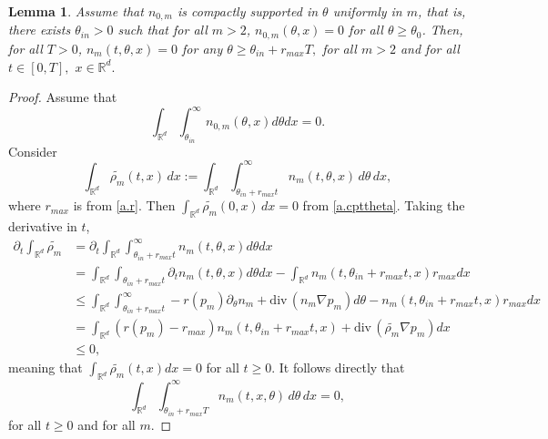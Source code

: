 \documentclass{amsart}
\newtheorem{lemma}[theorem]{Lemma}
\def\R{\mathbb R}
\def\div{\mathrm{div}\,}
\begin{document}
\begin{lemma}\label{t.cptspt}
    Assume that $n_{0,m}$ is compactly supported in $\theta$ uniformly in $m$, that is, there exists $\theta_{in}>0$ such that for all $m>2$, $n_{0,m}(\theta,x)=0$ for all $\theta \geq \theta_0$. Then, for all $T>0$, $n_m(t,\theta,x)=0$ for any $\theta \geq \theta_{in}+r_{max}T,$ for all $m>2$ and for all $t \in [0,T],$ $x \in \R^d.$
\end{lemma}
\begin{proof}
    Assume that
    \begin{equation}\label{a.cpttheta}
    \int_{\R^d}\int_{\theta_{in}}^{\infty}n_{0,m}(\theta,x)d\theta dx=0.
    \end{equation}
    Consider 
    $$
   \int_{\R^d} \widetilde{\rho_m}(t,x)\,dx:=\int_{\R^d}\int_{\theta_{in}+r_{max}t}^{\infty}n_m(t,\theta,x)\,d\theta \, dx,
    $$
    where $r_{max}$ is from \eqref{a.r}.  Then $\int_{\R^d}\tilde{\rho_m}(0,x)\,dx=0$ from \eqref{a.cpttheta}. 
    Taking the derivative in $t$,
    \begin{align*}
       \partial_t \int_{\R^d}\widetilde{\rho_m}&= \partial_t \int_{\R^d}\int_{\theta_{in}+r_{max}t}^{\infty}n_m(t,\theta,x)d\theta dx \\&=\int_{\R^d}\int_{\theta_{in}+r_{max}t} \partial_t n_m(t,\theta,x)d\theta dx -\int_{\R^d}n_m(t,\theta_{in}+r_{max}t,x)r_{max}dx\\
       &\leq \int_{\R^d}\int_{\theta_{in}+r_{max}t}^{\infty}-r(p_m)\partial_\theta n_m +\div(n_m \nabla p_m)d\theta -n_m(t,\theta_{in}+r_{max}t,x)r_{max}dx \\
       &=\int_{\R^d}(r(p_m)-r_{max})n_m(t,\theta_{in}+r_{max}t,x)+\div(\tilde{\rho_m}\nabla p_m) dx \\
       & \leq 0,
    \end{align*}
    meaning that $\int_{\R^d}\widetilde{\rho_m}(t,x)dx=0$ for all $t\geq 0$. It follows directly that 
    $$
    \int_{\R^d}\int_{\theta_{in}+r_{max}T}^{\infty}n_m(t,x,\theta)\,d\theta \,dx=0,
    $$
    for all $t\geq 0$ and for all $m$.
\end{proof}
\end{document}
